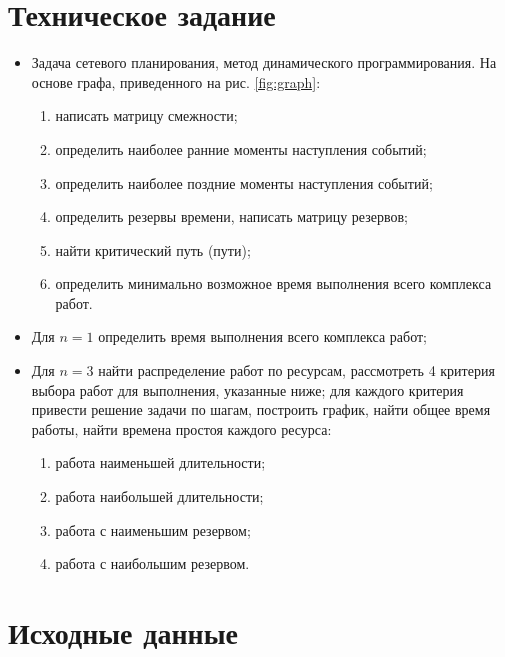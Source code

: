 






\tableofcontents
\listoftables
\listoffigures
\newpage

\section{Техническое задание}

\begin{itemize}
	\item Задача сетевого планирования, метод динамического
	программирования. На основе графа, приведенного на рис. \ref{fig:graph}:
	\begin{enumerate}
		\item написать матрицу смежности;
		\item определить наиболее ранние моменты наступления событий;
		\item определить наиболее поздние моменты наступления событий;
		\item определить резервы времени, написать матрицу резервов;
		\item найти критический путь (пути);
		\item определить минимально возможное время выполнения всего комплекса работ.
	\end{enumerate}
	\item Для $n = 1$ определить время выполнения всего комплекса работ;
	\item Для $n = 3$ найти распределение работ по ресурсам, рассмотреть 4 критерия выбора работ для выполнения, указанные ниже; для каждого критерия привести решение задачи по шагам, построить график, найти общее время работы, найти времена простоя каждого ресурса:
	\begin{enumerate}
		\item работа наименьшей длительности;
		\item работа наибольшей длительности;
		\item работа с наименьшим резервом;
		\item работа с наибольшим резервом. 
	\end{enumerate}
\end{itemize}

\vspace{-0.5cm}
\section{Исходные данные}

